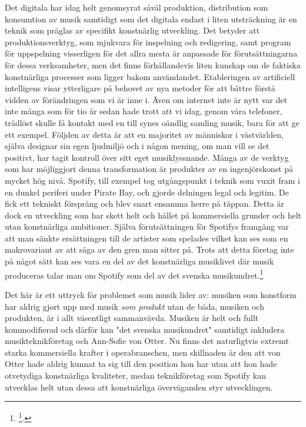 \documentclass[11pt]{article}
\begin{document}
Det digitala har idag helt genomsyrat såväl produktion, distribution som
konsumtion av musik samtidigt som det digitala endast i liten
utsträckning är en teknik som präglas av specifikt konstnärlig
utveckling. Det betyder att produktionsverktyg, som mjukvara för
inspelning och redigering, samt program för uppspelning visserligen för
det allra mesta är anpassade för förutsättningarna för dessa
verksamheter, men det finns förhållandevis liten kunskap om de faktiska
konstnärliga processer som ligger bakom användandet. Etableringen av
artificiell intelligens visar ytterligare på behovet av nya metoder för
att bättre förstå vidden av förändringen som vi är inne i. Även om
internet inte är nytt var det inte många som för tio år sedan hade trott
att vi idag, genom våra telefoner, trådlöst skulle få kontakt med en
till synes oändlig samling musik, bara för att ge ett exempel. Följden
av detta är att en majoritet av människor i västvärlden, själva designar
sin egen ljudmiljö och i någon mening, om man vill se det positivt, har
tagit kontroll över sitt eget musiklyssnande. Många av de verktyg som
har möjliggjort denna transformation är produkter av en ingenjörskonst
på mycket hög nivå. Spotify, till exempel tog utgångspunkt i teknik som
vuxit fram i en dunkel periferi under Pirate Bay, och gjorde delningen
legal och legitim. De fick ett tekniskt försprång och blev snart ensamma
herre på täppan. Detta är dock en utveckling som har skett helt och
hållet på kommersiella grunder och helt utan konstnärliga ambitioner.
Själva förutsättningen för Spotifys framgång var att man sänkte
ersättningen till de artister som spelades vilket kan ses som en
makrovariant av att såga av den gren man sitter på. Trots att detta
företag inte på något sätt kan ses vara en del av det konstnärliga
musiklivet där musik produceras talar man om Spotify som del av det
svenska musikundret.\footnote{\footcite{konig2018}.}

Det här är ett uttryck för problemet som musik lider av: musiken som
konstform har aldrig gjort upp med musik \emph{som produkt} utan de båda,
musiken och produkten, är i allt väsentligt sammanvävda. Musiken är helt
och fullt kommodifierad och därför kan "det svenska musikundret"
samtidigt inkludera musikteknikföretag och Ann-Sofie von Otter. Nu finns
det naturligtvis extremt starka kommersiella krafter i operabranschen,
men skillnaden är den att von Otter hade aldrig kunnat ta sig till den
position hon har utan att hon hade otvetydiga konstnärliga kvaliteter,
medan teknikföretag som Spotify kan utvecklas helt utan dessa att
konstnärliga överväganden styr utvecklingen.
\end{document}
